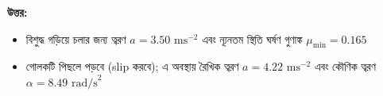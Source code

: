 \documentclass[12pt, a4paper]{article}
\begin{document}
\begin{tcolorbox}[answerbox]
\textbf{\color{success} উত্তর:} 
\begin{itemize}
    \item[(ক)] বিশুদ্ধ গড়িয়ে চলার জন্য ত্বরণ $a = 3.50\text{ ms}^{-2}$ এবং ন্যূনতম স্থিতি ঘর্ষণ গুণাঙ্ক $\mu_{\min} = 0.165$
    \item[(খ)] গোলকটি পিছলে পড়বে (slip করবে); এ অবস্থায় রৈখিক ত্বরণ $a = 4.22\text{ ms}^{-2}$ এবং কৌণিক ত্বরণ $\alpha = 8.49\text{ rad/s}^2$
\end{itemize}
\end{tcolorbox}
\vspace{1em}

\end{document}
